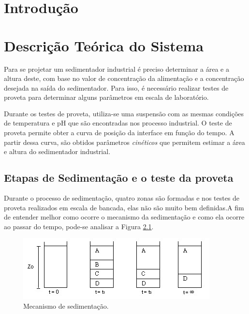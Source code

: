 \chapter{Introdução}



\chapter{Descrição Teórica do Sistema}


Para se projetar um sedimentador industrial é preciso determinar a área e a altura deste, com base no valor de concentração da alimentação e a concentração desejada na saída do sedimentador. Para isso, é necessário realizar testes de proveta para determinar alguns parâmetros em escala de laboratório.

Durante os testes de proveta, utiliza-se uma suspensão com as mesmas condições de temperatura e pH que são encontradas nos processo industrial. O teste de proveta permite obter a curva de posição da interface em função do tempo. A partir dessa curva, são obtidos parâmetros \emph{cinéticos} que permitem estimar a área e altura do sedimentador industrial.


\section{Etapas de Sedimentação e o teste da proveta}

Durante o processo de sedimentação, quatro zonas são formadas e nos testes de proveta realizados em escala de bancada, elas não são muito bem definidas.A fim de entender melhor como ocorre o mecanismo da sedimentação e como ela ocorre ao passar do tempo, pode-se analisar a Figura \ref{etapasprov}.


\begin{figure}[H]
	\begin{center}
		\includegraphics[scale=.8, trim={0 0 0 0}]{figuras/ladeq/sedi/proveta}
		\caption{Mecanismo de sedimentação.}
		\label{etapasprov}
	\end{center}
\end{figure}


